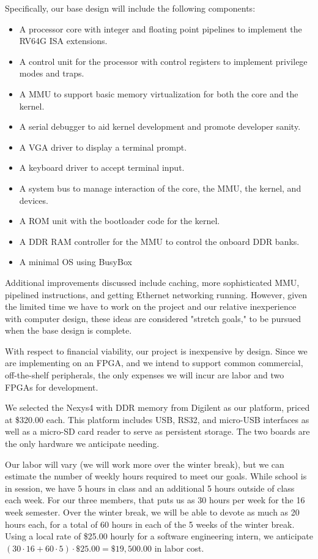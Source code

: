 \documentclass{article}
\begin{document}
Specifically, our base design will include the following components:
\begin{itemize}
    \item A processor core with integer and floating point pipelines to implement the RV64G ISA extensions.
    \item A control unit for the processor with control registers to implement privilege modes and traps.
    \item A MMU to support basic memory virtualization for both the core and the kernel.
    \item A serial debugger to aid kernel development and promote developer sanity.
    \item A VGA driver to display a terminal prompt.
    \item A keyboard driver to accept terminal input.
    \item A system bus to manage interaction of the core, the MMU, the kernel, and devices.
    \item A ROM unit with the bootloader code for the kernel.
    \item A DDR RAM controller for the MMU to control the onboard DDR banks.
    \item A minimal OS using BusyBox
\end{itemize}

Additional improvements discussed include caching, more sophisticated MMU, pipelined instructions, and getting Ethernet networking running.  However, given the limited time we have to work on the project and our relative inexperience with computer design, these ideas are considered "stretch goals," to be pursued when the base design is complete.

With respect to financial viability, our project is inexpensive by design.  Since we are implementing on an FPGA, and we intend to support common commercial, off-the-shelf peripherals, the only expenses we will incur are labor and two FPGAs for development.  

We selected the Nexys4 with DDR memory from Digilent as our platform, priced at \$320.00 each.  This platform includes USB, RS32, and micro-USB interfaces as well as a micro-SD card reader to serve as persistent storage.  The two boards are the only hardware we anticipate needing.

Our labor will vary (we will work more over the winter break), but we can estimate the number of weekly hours required to meet our goals.  While school is in session, we have 5 hours in class and an additional 5 hours outside of class each week.  For our three members, that puts us as 30 hours per week for the 16 week semester.  Over the winter break, we will be able to devote as much as 20 hours each, for a total of 60 hours in each of the 5 weeks of the winter break.  Using a local rate of \$25.00 hourly for a software engineering intern, we anticipate $(30\cdot 16 + 60\cdot 5)\cdot \$25.00 = \$19,500.00$ in labor cost.
\end{document}
